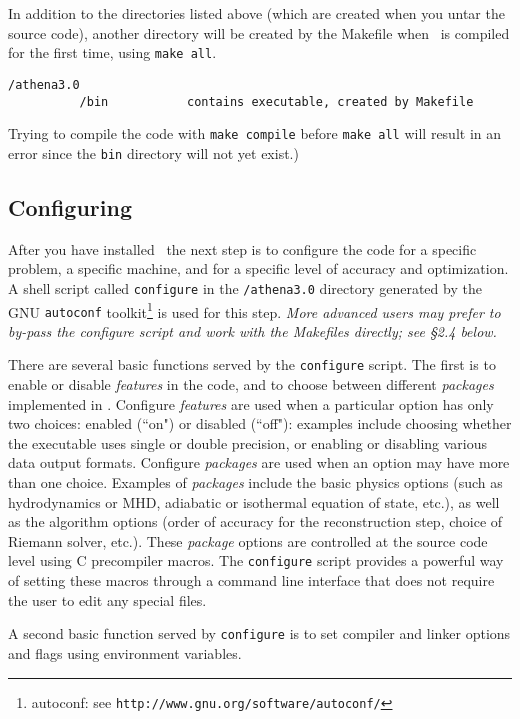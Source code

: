 In addition to the directories listed above (which are created when you
untar the source code), another directory will be created by the Makefile
when \ath\ is compiled for the first time, using {\tt make all}.

\footnotesize
\begin{verbatim}
/athena3.0
          /bin           contains executable, created by Makefile
\end{verbatim}
\normalsize

Trying to compile the code with {\tt make compile} before
{\tt make all} will result in an error since the {\tt bin} directory will
not yet exist.)

\subsection{Configuring \ath}

After you have installed \ath\, the next step is to configure the code
for a specific problem, a specific machine, and for a specific level of
accuracy and optimization.  A shell script called {\tt configure} in the 
{\tt /athena3.0} directory generated by the GNU
{\tt autoconf} toolkit\footnote{autoconf: see {\tt http://www.gnu.org/software/autoconf/}} is used for this step.
{\em More advanced users 
may prefer to by-pass the configure script and work with the Makefiles 
directly; see \S 2.4 below.}

There are several basic functions served by the {\tt configure} script.
The first is to enable or disable {\it features} in the code, and to
choose between different {\it packages} implemented in \ath.  Configure 
{\it features}
are used when a particular option has only two choices: enabled (``on")
or disabled (``off"): examples include choosing whether the executable
uses single or double precision, or enabling or disabling various data
output formats.  Configure {\it packages} are used when an option may have
more than one choice.  Examples of {\it packages} include the basic
physics options (such as hydrodynamics or MHD, adiabatic or isothermal
equation of state, etc.), as well as the algorithm options (order of
accuracy for the reconstruction step, choice of Riemann solver, etc.).
These {\it package} options are controlled at the source code level using C
precompiler macros.  The {\tt configure} script provides a powerful way
of setting these macros through a command line interface that does not
require the user to edit any special files.

A second basic function served by {\tt configure} is to set compiler and linker 
options and flags using environment variables.

